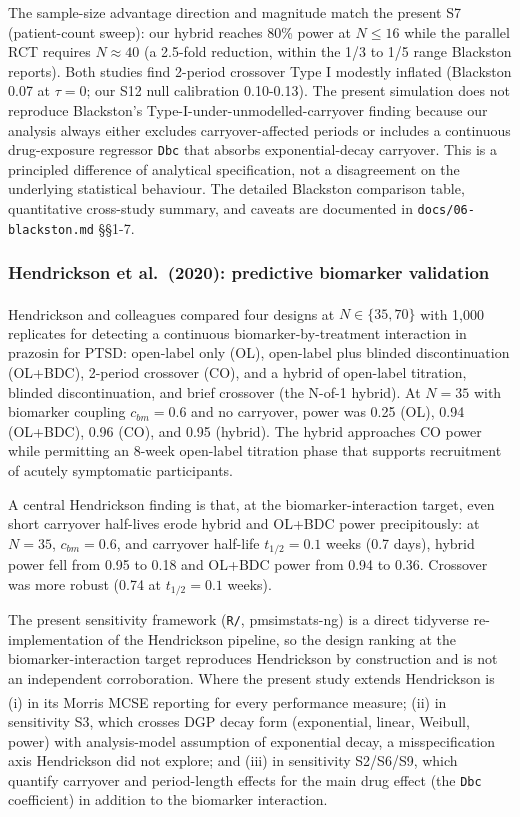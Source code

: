 \documentclass[
  11pt,
]{article}
\begin{document}
The sample-size advantage direction and magnitude match the present S7
(patient-count sweep): our hybrid reaches 80\% power at \(N \le 16\)
while the parallel RCT requires \(N \approx 40\) (a 2.5-fold reduction,
within the 1/3 to 1/5 range Blackston reports). Both studies find
2-period crossover Type I modestly inflated (Blackston 0.07 at
\(\tau = 0\); our S12 null calibration 0.10-0.13). The present
simulation does not reproduce Blackston's
Type-I-under-unmodelled-carryover finding because our analysis always
either excludes carryover-affected periods or includes a continuous
drug-exposure regressor \texttt{Dbc} that absorbs exponential-decay
carryover. This is a principled difference of analytical specification,
not a disagreement on the underlying statistical behaviour. The detailed
Blackston comparison table, quantitative cross-study summary, and
caveats are documented in \texttt{docs/06-blackston.md} §§1-7.

\subsubsection{Hendrickson et al.~(2020): predictive biomarker
validation}\label{hendrickson-et-al.-2020-predictive-biomarker-validation}

Hendrickson and
colleagues\textsuperscript{}
compared four designs at \(N \in \{35, 70\}\) with 1,000 replicates for
detecting a continuous biomarker-by-treatment interaction in prazosin
for PTSD: open-label only (OL), open-label plus blinded discontinuation
(OL+BDC), 2-period crossover (CO), and a hybrid of open-label titration,
blinded discontinuation, and brief crossover (the N-of-1 hybrid). At
\(N = 35\) with biomarker coupling \(c_{bm} = 0.6\) and no carryover,
power was 0.25 (OL), 0.94 (OL+BDC), 0.96 (CO), and 0.95 (hybrid). The
hybrid approaches CO power while permitting an 8-week open-label
titration phase that supports recruitment of acutely symptomatic
participants.

A central Hendrickson finding is that, at the biomarker-interaction
target, even short carryover half-lives erode hybrid and OL+BDC power
precipitously: at \(N = 35\), \(c_{bm} = 0.6\), and carryover half-life
\(t_{1/2} = 0.1\) weeks (0.7 days), hybrid power fell from 0.95 to 0.18
and OL+BDC power from 0.94 to 0.36. Crossover was more robust (0.74 at
\(t_{1/2} = 0.1\) weeks).

The present sensitivity framework (\texttt{R/}, pmsimstats-ng) is a
direct tidyverse re-implementation of the Hendrickson pipeline, so the
design ranking at the biomarker-interaction target reproduces
Hendrickson by construction and is not an independent corroboration.
Where the present study extends Hendrickson is (i) in its
Morris\textsuperscript{} MCSE
reporting for every performance measure; (ii) in sensitivity S3, which
crosses DGP decay form (exponential, linear, Weibull, power) with
analysis-model assumption of exponential decay, a misspecification axis
Hendrickson did not explore; and (iii) in sensitivity S2/S6/S9, which
quantify carryover and period-length effects for the main drug effect
(the \texttt{Dbc} coefficient) in addition to the biomarker interaction.
\end{document}

